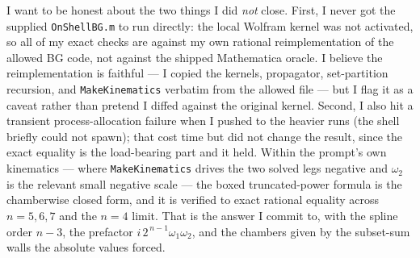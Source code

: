 \documentclass{article}
\begin{document}
I want to be honest about the two things I did \emph{not} close. First, I never
got the supplied \texttt{OnShellBG.m} to run directly: the local Wolfram kernel
was not activated, so all of my exact checks are against my own rational
reimplementation of the allowed BG code, not against the shipped Mathematica
oracle. I believe the reimplementation is faithful --- I copied the kernels,
propagator, set-partition recursion, and \texttt{MakeKinematics} verbatim from
the allowed file --- but I flag it as a caveat rather than pretend I diffed
against the original kernel. Second, I also hit a transient process-allocation
failure when I pushed to the heavier runs (the shell briefly could not spawn);
that cost time but did not change the result, since the exact equality is the
load-bearing part and it held. Within the prompt's own kinematics --- where
\texttt{MakeKinematics} drives the two solved legs negative and $\omega_2$ is the
relevant small negative scale --- the boxed truncated-power formula is the
chamberwise closed form, and it is verified to exact rational equality across
$n=5,6,7$ and the $n=4$ limit. That is the answer I commit to, with the spline
order $n-3$, the prefactor $i\,2^{\,n-1}\omega_1\omega_2$, and the chambers given
by the subset-sum walls the absolute values forced.
\end{document}
